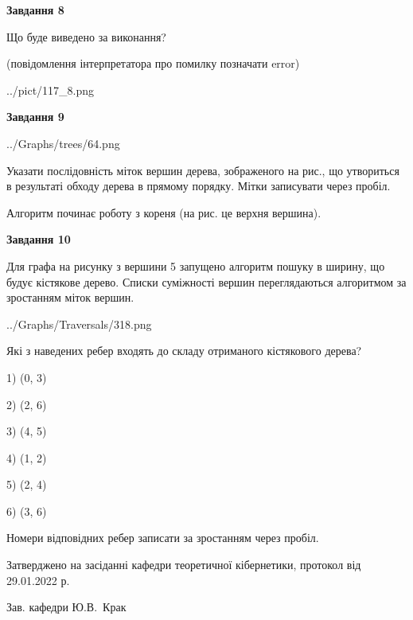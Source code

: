 \documentclass[12pt, ukrainian]{article}
\begin{document}
{\begin {large}
{\begin {center}\textbf{Завдання 8}\end {center}}\par
Що буде виведено за виконання?\par
 (повідомлення інтерпретатора про помилку позначати error)\par
\begin{center}
	{../pict/117_8.png}
\end{center}
\newpage

{\begin {center}\textbf{Завдання 9}\end {center}}\par

\begin{center}
	{../Graphs/trees/64.png}
\end{center}
Указати послідовність міток вершин дерева, зображеного на рис., що утвориться в результаті обходу дерева в прямому порядку. Мітки записувати через пробіл.\par Алгоритм починає роботу з кореня (на рис. це верхня вершина).\par
\newpage

{\begin {center}\textbf{Завдання 10}\end {center}}\par
Для графа на рисунку з вершини 5 запущено алгоритм пошуку в ширину, що будує кістякове дерево. Списки суміжності вершин переглядаються алгоритмом за зростанням міток вершин.\par
\begin{center}
	{../Graphs/Traversals/318.png}
\end{center}
\par Які з наведених ребер входять до складу отриманого кістякового дерева?\par
1) (0, 3)\par
2) (2, 6)\par
3) (4, 5)\par
4) (1, 2)\par
5) (2, 4)\par
6) (3, 6)\par
{\vskip 15pt} Номери відповідних ребер записати за зростанням через пробіл.\par
\newpage


\end {large}
}
{\smallskip \begin {small} Затверджено на засіданні кафедри теоретичної кібернетики, протокол  від   29.01.2022 р.\par\smallskip\smallskip
{\parbox {6.5 cm}{Зав. кафедри \dotfill Ю.В.~Крак}} \end{small}}
\end{document}
